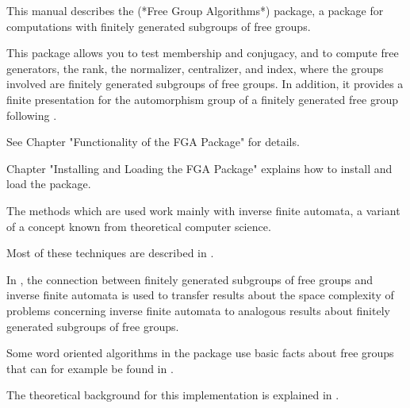 



This manual describes the {\FGA} (*Free Group Algorithms*) package,
a {\GAP} package for computations with finitely generated subgroups of
free groups.

This package allows you to test membership and conjugacy, and to compute
free generators, the rank, the normalizer, centralizer, and index,
where the groups involved are finitely generated subgroups of free groups.
%
In addition, it provides a finite presentation for the
automorphism group of a finitely generated free group following
\cite{Neumann33}.

See Chapter "Functionality of the FGA Package" for details.

Chapter "Installing and Loading the FGA Package" explains
how to install and load the {\FGA} package.


The methods which are used work mainly with inverse finite automata,
a variant of a concept known from theoretical computer science.

Most of these techniques are described in \cite{Sims94}.

In \cite{BirgetEtAl00}, the connection between finitely generated
subgroups of free groups and inverse finite automata is used to transfer
results about the space complexity of problems concerning inverse finite
automata to analogous results about finitely generated subgroups of free
groups.

Some word oriented algorithms in the {\FGA} package use basic facts about
free groups that can for example be found in \cite{LyndonSchupp77}.

The theoretical background for this implementation is explained
in \cite{Sievers03}.

